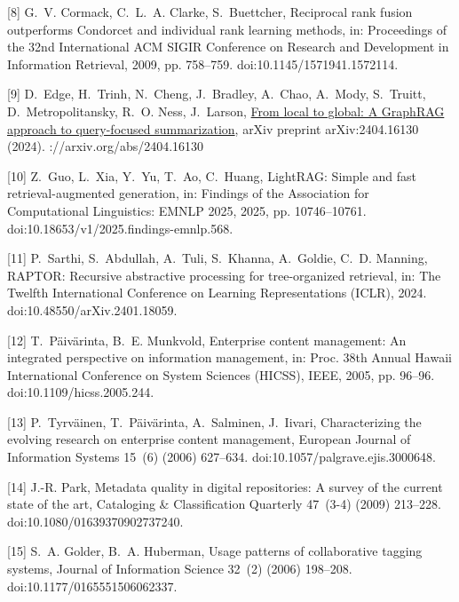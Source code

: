 \documentclass[11pt]{article}
\begin{document}
[8] 
G.~V. Cormack, C.~L.~A. Clarke, S.~Buettcher, Reciprocal rank fusion
  outperforms {Condorcet} and individual rank learning methods, in: Proceedings
  of the 32nd International {ACM} {SIGIR} Conference on Research and
  Development in Information Retrieval, 2009, pp. 758--759.
  doi:10.1145/1571941.1572114.



[9] 
D.~Edge, H.~Trinh, N.~Cheng, J.~Bradley, A.~Chao, A.~Mody, S.~Truitt,
  D.~Metropolitansky, R.~O. Ness, J.~Larson,
  \href{https://arxiv.org/abs/2404.16130}{From local to global: A {GraphRAG}
  approach to query-focused summarization}, arXiv preprint arXiv:2404.16130
  (2024).
\newlinehttps://arxiv.org/abs/2404.16130



[10] 
Z.~Guo, L.~Xia, Y.~Yu, T.~Ao, C.~Huang, {LightRAG}: Simple and fast
  retrieval-augmented generation, in: Findings of the Association for
  Computational Linguistics: EMNLP 2025, 2025, pp. 10746--10761.
  doi:10.18653/v1/2025.findings-emnlp.568.



[11] 
P.~Sarthi, S.~Abdullah, A.~Tuli, S.~Khanna, A.~Goldie, C.~D. Manning, {RAPTOR}:
  Recursive abstractive processing for tree-organized retrieval, in: The
  Twelfth International Conference on Learning Representations ({ICLR}), 2024.
  doi:10.48550/arXiv.2401.18059.



[12] 
T.~P{\"a}iv{\"a}rinta, B.~E. Munkvold, Enterprise content management: An
  integrated perspective on information management, in: Proc. 38th Annual
  Hawaii International Conference on System Sciences (HICSS), IEEE, 2005, pp.
  96--96.
  doi:10.1109/hicss.2005.244.



[13] 
P.~Tyrv{\"a}inen, T.~P{\"a}iv{\"a}rinta, A.~Salminen, J.~Iivari, Characterizing
  the evolving research on enterprise content management, European Journal of
  Information Systems 15~(6) (2006) 627--634.
  doi:10.1057/palgrave.ejis.3000648.



[14] 
J.-R. Park, Metadata quality in digital repositories: A survey of the current
  state of the art, Cataloging \& Classification Quarterly 47~(3-4) (2009)
  213--228.
  doi:10.1080/01639370902737240.



[15] 
S.~A. Golder, B.~A. Huberman, Usage patterns of collaborative tagging systems,
  Journal of Information Science 32~(2) (2006) 198--208.
  doi:10.1177/0165551506062337.
\end{document}
